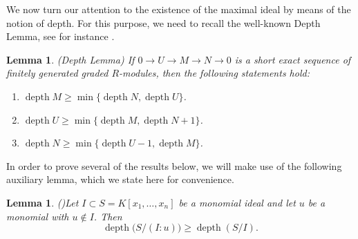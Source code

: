 \documentclass[11pt]{amsart}
\newtheorem{lemma}[theorem]{Lemma}
\def\depth{\operatorname{depth}}
\begin{document}
We now turn our attention to the existence of the maximal ideal by means of the notion of depth. 
For this purpose, we need to recall  the well-known Depth Lemma, see for instance \cite[Lemma 2.3.9]{V1}. %

\begin{lemma}\label{dep}(Depth Lemma)
If $0 \rightarrow U \rightarrow M \rightarrow N \rightarrow 0$ is a short exact sequence of finitely generated graded $R$-modules, then the following statements hold:
\begin{enumerate}
\item[(1)] $\depth M \geq \min\{\depth N,\depth U\}$.
\item[(2)] $\depth U \geq \min\{\depth M,\depth N +1\}$.
\item[(3)] $\depth N \geq \min\{\depth U-1,\depth M\}$.
\end{enumerate}
\end{lemma}


In order to prove several of the results below, we will make use of the following auxiliary lemma, which we state here for convenience.

\begin{lemma}(\cite[Corollary 1.3]{asia})\label{asia}
Let $I \subset S=K[x_1,\ldots,x_n]$ be a monomial ideal and let $u$ be a monomial with $u \notin I$. Then
\[
\depth\big(S/(I : u)\big) \geq \depth(S/I).
\]
\end{lemma}

\end{document}
